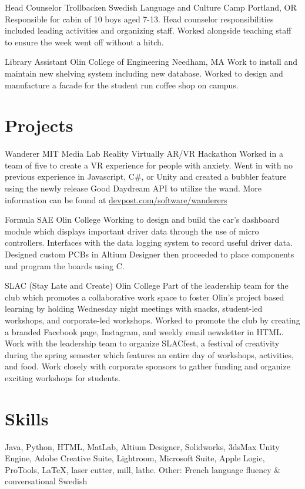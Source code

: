 \documentclass[11.5pt]{moderncv}
\begin{document}
{Head Counselor}
{Trollbacken Swedish Language and Culture Camp}
{Portland, OR}
{}
{Responsible for cabin of 10 boys aged 7-13. Head counselor responsibilities included leading activities and organizing staff. Worked alongside teaching staff to ensure the week went off without a hitch.}

{Library Assistant}
{Olin College of Engineering}
{Needham, MA}
{}
{Work to install and maintain new shelving system including new database. Worked to design and manufacture a facade for the student run coffee shop on campus.}

\vspace{0.05 in}
\section{Projects}

{Wanderer}
{MIT Media Lab Reality Virtually AR/VR Hackathon}
{}
{}
{Worked in a team of five to create a VR experience for people with anxiety. Went in with no previous experience in Javascript, C\#, or Unity and created a bubbler feature using the newly release Good Daydream API to utilize the wand. More information can be found at \href{https://devpost.com/software/wanderers}{devpost.com/software/wanderers}}

{Formula SAE}
{Olin College}
{}
{}
{Working to design and build the car's dashboard module which displays important driver data through the use of micro controllers. Interfaces with the data logging system to record useful driver data. Designed custom PCBs in Altium Designer then proceeded to place components and program the boards using C.}

{SLAC (Stay Late and Create)}
{Olin College}
{}
{}
{Part of the leadership team for the club which promotes a collaborative work space to foster Olin's project based learning by holding Wednesday night meetings with snacks, student-led workshops, and corporate-led workshops. Worked to promote the club by creating a branded Facebook page, Instagram, and weekly email newsletter in HTML. Work with the leadership team to organize SLACfest, a festival of creativity during the spring semester which features an entire day of workshops, activities, and food. Work closely with corporate sponsors to gather funding and organize exciting  workshops for students.}

\section{Skills}

\cvline{}
{
Java,
Python,
HTML,
MatLab,
Altium Designer,
Solidworks,
3dsMax
Unity Engine,
Adobe Creative Suite,
Lightroom,
Microsoft Suite,
Apple Logic,
ProTools,
\LaTeX{},
laser cutter,
mill,
lathe.
}
\cvline{}
{Other: French language fluency \& conversational Swedish}
\end{document}
